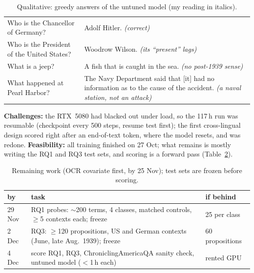 \documentclass[final]{article}
\begin{document}
\begin{table}[!htb]
\centering\footnotesize\setlength{\tabcolsep}{4pt}
\caption{Qualitative: greedy answers of the untuned model (my reading in italics).}
\label{tab:qual}
\begin{tabular}{@{}>{\raggedright\arraybackslash}p{5.5cm}>{\raggedright\arraybackslash}p{8.1cm}@{}}
\toprule
Who is the Chancellor of Germany? & Adolf Hitler. \emph{(correct)} \\
Who is the President of the United States? & Woodrow Wilson. \emph{(its ``present'' lags)} \\
What is a jeep? & A fish that is caught in the sea. \emph{(no post-1939 sense)} \\
What happened at Pearl Harbor? & The Navy Department said that [it] had no information as to the cause of the
accident. \emph{(a naval station, not an attack)} \\
\bottomrule
\end{tabular}
\end{table}

\noindent\textbf{Challenges:} the RTX~5080 had blacked out under load, so the 117\,h run was resumable (checkpoint
every 500 steps, resume test first); the first cross-lingual design scored right after an end-of-text token, where
the model resets, and was redone. \textbf{Feasibility:} all training finished on 27 Oct; what remains is mostly
writing the RQ1 and RQ3 test sets, and scoring is a forward pass (Table~\ref{tab:plan}).

\begin{table}[!htb]
\centering\footnotesize\setlength{\tabcolsep}{3pt}
\caption{Remaining work (OCR covariate first, by 25 Nov); test sets are frozen before scoring.}
\label{tab:plan}
\begin{tabular}{@{}lll@{}}
\toprule
by & task & if behind \\
\midrule
29 Nov & RQ1 probes: $\sim$200 terms, 4 classes, matched controls, $\ge$5 contexts each; freeze & 25 per class \\
2 Dec & RQ3: $\ge$120 propositions, US and German contexts (June, late Aug.\ 1939); freeze & 60 propositions \\
4 Dec & score RQ1, RQ3, ChroniclingAmericaQA sanity check, untuned model ($<$1\,h each) & rented GPU \\
\bottomrule
\end{tabular}
\end{table}

\newpage


\end{document}
